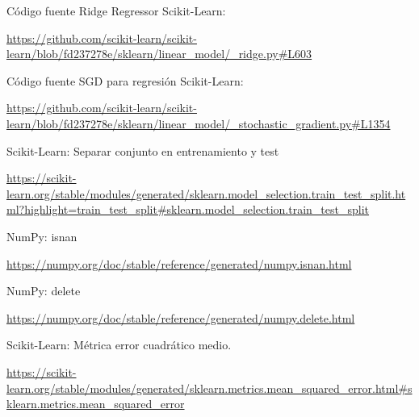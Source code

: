 \documentclass[12pt, spanish]{article}
\begin{document}
\begin{thebibliography}{9}
Código fuente Ridge Regressor Scikit-Learn:

\url{https://github.com/scikit-learn/scikit-learn/blob/fd237278e/sklearn/linear_model/_ridge.py#L603}



Código fuente SGD para regresión Scikit-Learn:

\url{https://github.com/scikit-learn/scikit-learn/blob/fd237278e/sklearn/linear_model/_stochastic_gradient.py#L1354}



Scikit-Learn: Separar conjunto en entrenamiento y test

\url{https://scikit-learn.org/stable/modules/generated/sklearn.model_selection.train_test_split.html?highlight=train_test_split#sklearn.model_selection.train_test_split}


NumPy: isnan

\url{https://numpy.org/doc/stable/reference/generated/numpy.isnan.html}

NumPy: delete

\url{https://numpy.org/doc/stable/reference/generated/numpy.delete.html}


Scikit-Learn: Métrica error cuadrático medio.

\url{https://scikit-learn.org/stable/modules/generated/sklearn.metrics.mean_squared_error.html#sklearn.metrics.mean_squared_error}

\end{thebibliography}
\end{document}
